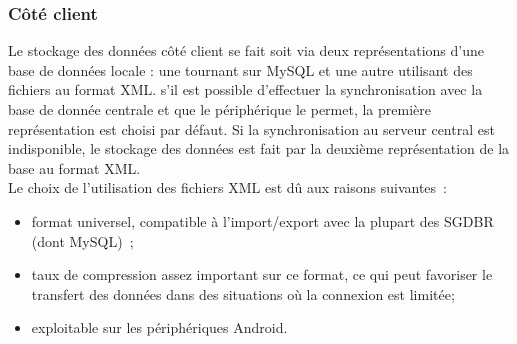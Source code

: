 \subsubsection{Côté client}
Le stockage des données côté client se fait soit via deux représentations d'une base de données locale : une tournant sur MySQL et une autre utilisant des fichiers au format XML. s'il est possible d'effectuer la synchronisation avec la base de donnée centrale et que le périphérique le permet, la première représentation est choisi par défaut. Si la synchronisation au serveur central est indisponible, le stockage des données est fait par la deuxième représentation de la base au format XML. \\
Le choix de l'utilisation des fichiers XML est dû aux raisons suivantes~:
\begin{itemize}
	\item format universel, compatible à l'import/export avec la plupart des SGDBR (dont MySQL)~;
	\item taux de compression assez important sur ce format, ce qui peut favoriser le transfert des données dans des situations où la connexion est limitée;
	\item exploitable sur les périphériques Android.
\end{itemize}


